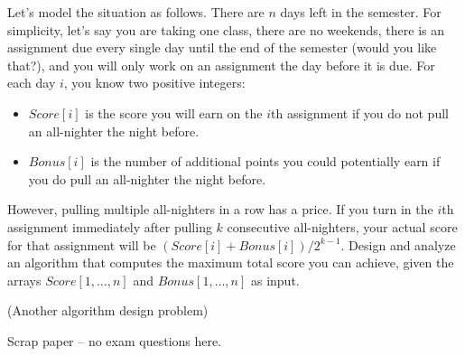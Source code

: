 \documentclass[12pt,answers,addpoints]{exam}
\begin{document}
\begin{questions}
  Let’s model the situation as follows. There are $n$ days left in the
  semester. For simplicity, let's say you are taking one class, there
  are no weekends, there is an assignment due every single day until
  the end of the semester (would you like that?), and you will only
  work on an assignment the day before it is due. For each day $i$,
  you know two positive integers:
  \begin{itemize}
  \item $Score[i]$ is the score you will earn on the $i$th assignment
    if you do not pull an all-nighter the night before.
  \item $Bonus[i]$ is the number of additional points you could
    potentially earn if you do pull an all-nighter the night before.
  \end{itemize}
  However, pulling multiple all-nighters in a row has a price. If you
  turn in the $i$th assignment immediately after pulling $k$
  consecutive all-nighters, your actual score for that assignment will
  be $(Score[i] + Bonus[i])/2^{k-1}$.  Design and analyze an algorithm
  that computes the maximum total score you can achieve, given the
  arrays $Score[1,\ldots,n]$ and $Bonus[1, \ldots,n]$ as input.

  \newpage 
  \question[20] (Another algorithm design problem)
\end{questions}
\newpage
\begin{center}
Scrap paper -- no exam questions here.  
\end{center}
\end{document}
